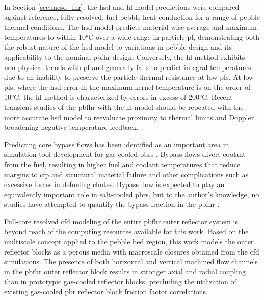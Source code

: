 In Section \ref{sec:meso_fhr}, the \gls{hsd} and \gls{hl} model predictions were compared against reference, fully-resolved, fuel pebble heat conduction for a range of pebble thermal conditions. The \gls{hsd} model predicts material-wise average and maximum temperatures to within 10\si{\celsius} over a wide range in particle \gls{pf}, demonstrating both the robust nature of the \gls{hsd} model to variations in pebble design and its applicability to the nominal \gls{pbfhr} design. Conversely, the \gls{hl} method exhibits non-physical trends with \gls{pf} and generally fails to predict integral temperatures due to an inability to preserve the particle thermal resistance at low \glspl{pf}. At low \glspl{pf}, where the \gls{hsd} error in the maximum kernel temperature is on the order of 10\si{\celsius}, the \gls{hl} method is characterized by errors in excess of 200\si{\celsius}. Recent transient studies of the \gls{pbfhr} with the \gls{hl} model \cite{xin_wang_thesis} should be repeated with the more accurate \gls{hsd} model to reevaluate proximity to thermal limits and Doppler broadening negative temperature feedback.

Predicting core bypass flows has been identified as an important area in simulation tool development for gas-cooled \glspl{pbr} \cite{gou_2018}. Bypass flows divert coolant from the fuel, resulting in higher fuel and coolant temperatures that reduce margins to \gls{cfp} and structural material failure and other complications such as excessive forces in defueling chutes. Bypass flow is expected to play an equivalently important role in salt-cooled \glspl{pbr}, but to the author's knowledge, no studies have attempted to quantify the bypass fraction in the \gls{pbfhr} \cite{pbfhr_website}.

Full-core resolved \gls{cfd} modeling of the entire \gls{pbfhr} outer reflector system is beyond reach of the computing resources available for this work. Based on the multiscale concept applied to the pebble bed region, this work models the outer reflector blocks as a porous media with macroscale closures obtained from the \gls{cfd} simulations. The presence of both horizontal and vertical machined flow channels in the \gls{pbfhr} outer reflector block results in stronger axial and radial coupling than in prototypic gas-cooled reflector blocks, precluding the utilization of existing gas-cooled \gls{pbr} reflector block friction factor correlations. 

